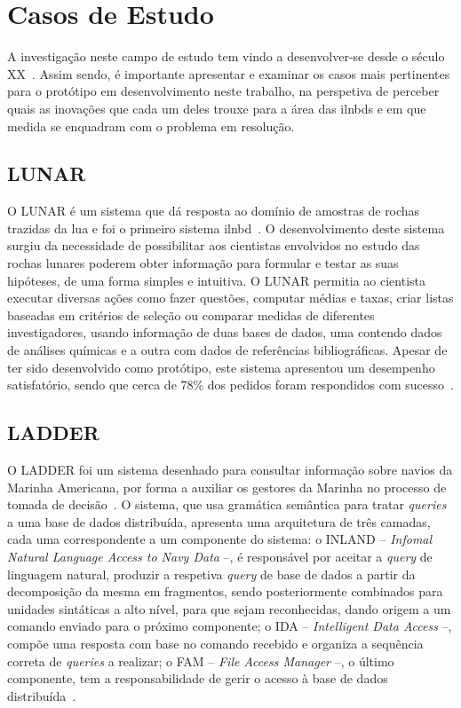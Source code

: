 \section{Casos de Estudo}
\label{sec:chap3_marketstudy}

A investigação neste campo de estudo tem vindo a desenvolver-se desde o século XX~\parencite{survey_nlidb}. Assim sendo, é importante apresentar e examinar os casos mais pertinentes para o protótipo em desenvolvimento neste trabalho, na perspetiva de perceber quais as inovações que cada um deles trouxe para a área das \glspl{ilnbd} e em que medida se enquadram com o problema em resolução.

\subsection{LUNAR}

O LUNAR é um sistema que dá resposta ao domínio de amostras de rochas trazidas da lua e foi o primeiro sistema \gls{ilnbd}~\parencite{nlidb_brief_review, survey_nlidb}. O desenvolvimento deste sistema surgiu da necessidade de possibilitar aos cientistas envolvidos no estudo das rochas lunares poderem obter informação para formular e testar as suas hipóteses, de uma forma simples e intuitiva. O LUNAR permitia ao cientista executar diversas ações como fazer questões, computar médias e taxas, criar listas baseadas em critérios de seleção ou comparar medidas de diferentes investigadores, usando informação de duas bases de dados, uma contendo dados de análises químicas e a outra com dados de referências bibliográficas. Apesar de ter sido desenvolvido como protótipo, este sistema apresentou um desempenho satisfatório, sendo que cerca de 78\% dos pedidos foram respondidos com sucesso~\parencite{lunar_sciences_nlis}.

\subsection{LADDER}

O LADDER foi um sistema desenhado para consultar informação sobre navios da Marinha Americana, por forma a auxiliar os gestores da Marinha no processo de tomada de decisão~\parencite{nlidb_brief_review, developing_nli_complex_data}. O sistema, que usa gramática semântica para tratar \textit{queries} a uma base de dados distribuída, apresenta uma arquitetura de três camadas, cada uma correspondente a um componente do sistema: o INLAND -- \textit{Infomal Natural Language Access to Navy Data} --, é responsável por aceitar a \textit{query} de linguagem natural, produzir a respetiva \textit{query} de base de dados a partir da decomposição da mesma em fragmentos, sendo posteriormente combinados para unidades sintáticas a alto nível, para que sejam reconhecidas, dando origem a um comando enviado para o próximo componente; o IDA -- \textit{Intelligent Data Access} --, compõe uma resposta com base no comando recebido e organiza a sequência correta de \textit{queries} a realizar; o FAM -- \textit{File Access Manager} --, o último componente, tem a responsabilidade de gerir o acesso à base de dados distribuída~\parencite{developing_nli_complex_data}.

